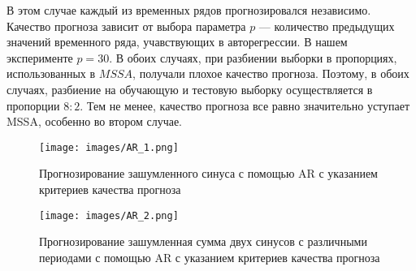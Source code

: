 \documentclass{article}
\begin{document}
В этом случае каждый из временных рядов прогнозировался независимо. Качество прогноза зависит от выбора параметра $p$ --- количество предыдущих значений временного ряда, учавствующих в авторегрессии. В нашем эксперименте $p = 30$. В обоих случаях, при разбиении выборки в пропорциях, использованных в $MSSA$, получали плохое качество прогноза. Поэтому, в обоих случаях, разбиение на обучающую и тестовую выборку осуществляется в пропорции $8:2$. Тем не менее, качество прогноза все равно значительно уступает MSSA, особенно во втором случае.

\begin{figure}[!htbp]
\centering
{\texttt{[image: images/AR\_1.png]} }
\caption{Прогнозирование зашумленного синуса с помощью AR с указанием критериев качества прогноза}
\label{fig:ARsine}
\end{figure}

\begin{figure}[!htbp]
\centering
{\texttt{[image: images/AR\_2.png]} }
\caption{Прогнозирование зашумленная сумма двух синусов с различными периодами с помощью AR с указанием критериев качества прогноза}
\label{fig:AR2sines}
\end{figure}



\end{document}

